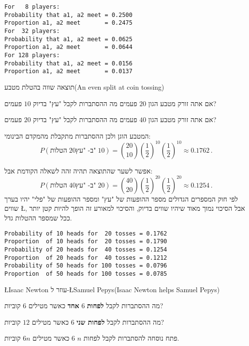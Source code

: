 \sml{}
\begin{verbatim}
For   8 players:
Probability that a1, a2 meet = 0.2500
Proportion a1, a2 meet       = 0.2475
For  32 players:
Probability that a1, a2 meet = 0.0625
Proportion a1, a2 meet       = 0.0644
For 128 players:
Probability that a1, a2 meet = 0.0156
Proportion a1, a2 meet       = 0.0137
\end{verbatim}


\begin{prob}{תוצאה שווה בהטלת מטבע}{}{(An even split at coin tossing)}

אם אתה זורק מטבע הגון 
$20$
פעמים מה ההסתברות לקבל "עץ" בדיוק 
$10$
פעמים?

אם אתה זורק מטבע הגון 
$40$
פעמים מה ההסתברות לקבל "עץ" בדיוק 
$20$
פעמים?
\end{prob}

\solution{}

המטבע הוגן ולכן ההסתברות מתקבלת מהמקדם הבינומי:
\[
P(\textrm{הטלות}\; 20\textrm{ב- "עץ"}\;10)=
{20 \choose 10} \left(\frac{1}{2}\right)^{10}\left(\frac{1}{2}\right)^{10}\approx 0.1762\,.
\]

אפשר לשער שהתוצאה תהיה זהה לשאלה הקודמת אבל:
\[
P(\textrm{הטלות}\;40\textrm{ב- "עץ"}\;20)=
{40 \choose 20} \left(\frac{1}{2}\right)^{20}\left(\frac{1}{2}\right)^{20}\approx 0.1254\,.
\]
לפי חוק המספרים הגדולים מספר ההופעות של "עץ" ומספר ההופעות של "פלי" יהיו בערך שווים
\L{\cite[Section~8.4]{ross}},
אבל הסיכוי נמוך מאוד שיהיו שווים בדיוק, והסיכוי למאורע זה הופך להיות קטן יותר ככל שמספר ההטלות גדל.

\sml{}
\begin{verbatim}
Probability of 10 heads for  20 tosses = 0.1762
Proportion  of 10 heads for  20 tosses = 0.1790
Probability of 20 heads for  40 tosses = 0.1254
Proportion  of 20 heads for  40 tosses = 0.1212
Probability of 50 heads for 100 tosses = 0.0796
Proportion  of 50 heads for 100 tosses = 0.0785
\end{verbatim}


\begin{prob}{\L{\small Isaac Newton} עוזר ל-\L{\small Samuel Pepys}}{}{(Isaac Newton helps Samuel Pepys)}

מה ההסתברות לקבל
\textbf{לפחות}
$6$
\textbf{אחד}
כאשר מטילים 
$6$
קוביות?

מה ההסתברות לקבל
\textbf{לפחות שני}
$6$
כאשר מטילים 
$12$
קוביות?

פתח נוסחה להסתברות לקבל לפחות
$n$ $6$
כאשר מטילים 
$6n$
קוביות.
\end{prob}

